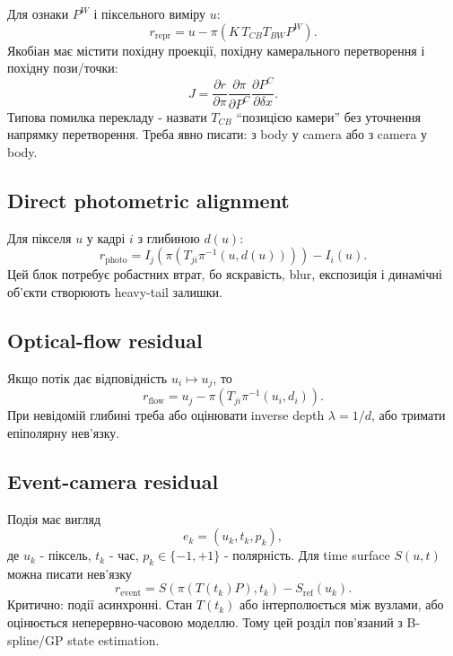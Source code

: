 Для ознаки $P^W$ і піксельного виміру $u$:
\begin{equation}
 r_{\mathrm{repr}}=u-\pi\left(K\,T_{CB}T_{BW}P^W\right).
\end{equation}
Якобіан має містити похідну проекції, похідну камерального перетворення і похідну пози/точки:
\begin{equation}
 J = \frac{\partial r}{\partial \pi}\frac{\partial \pi}{\partial P^C}
 \frac{\partial P^C}{\partial \delta x}.
\end{equation}
Типова помилка перекладу - назвати $T_{CB}$ ``позицією камери'' без уточнення напрямку перетворення. Треба явно писати: з body у camera або з camera у body.

\subsection{Direct photometric alignment}

Для пікселя $u$ у кадрі $i$ з глибиною $d(u)$:
\begin{equation}
 r_{\mathrm{photo}} = I_j\left(\pi\left(T_{ji}\pi^{-1}(u,d(u))\right)\right)-I_i(u).
\end{equation}
Цей блок потребує робастних втрат, бо яскравість, blur, експозиція і динамічні об'єкти створюють heavy-tail залишки.

\subsection{Optical-flow residual}

Якщо потік дає відповідність $u_i\mapsto u_j$, то
\begin{equation}
 r_{\mathrm{flow}} = u_j-\pi\left(T_{ji}\pi^{-1}(u_i,d_i)\right).
\end{equation}
При невідомій глибині треба або оцінювати inverse depth $\lambda=1/d$, або тримати епіполярну нев'язку.

\subsection{Event-camera residual}

Подія має вигляд
\begin{equation}
 e_k=(u_k,t_k,p_k),
\end{equation}
де $u_k$ - піксель, $t_k$ - час, $p_k\in\{-1,+1\}$ - полярність. Для time surface $S(u,t)$ можна писати нев'язку
\begin{equation}
 r_{\mathrm{event}} = S\left(\pi(T(t_k)P),t_k\right)-S_{\mathrm{ref}}(u_k).
\end{equation}
Критично: події асинхронні. Стан $T(t_k)$ або інтерполюється між вузлами, або оцінюється неперервно-часовою моделлю. Тому цей розділ пов'язаний з B-spline/GP state estimation.

